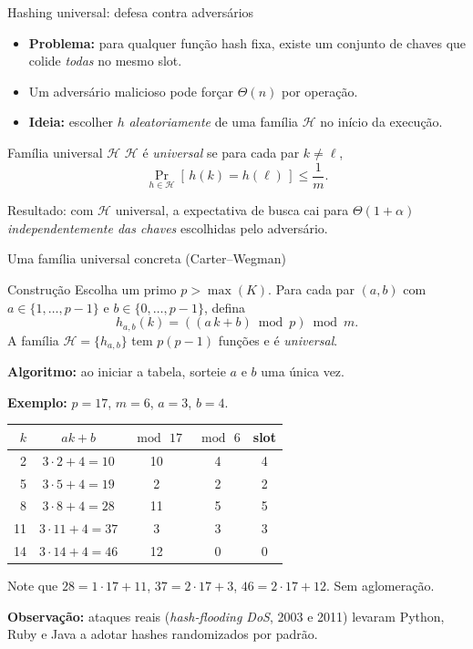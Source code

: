 \documentclass[aspectratio=169]{beamer}
\begin{document}
\begin{frame}{Hashing universal: defesa contra adversários}
\begin{itemize}
\item \textbf{Problema:} para qualquer função hash fixa, existe um conjunto de chaves que colide \emph{todas} no mesmo slot.
\item Um adversário malicioso pode forçar $\Theta(n)$ por operação.
\item \textbf{Ideia:} escolher $h$ \emph{aleatoriamente} de uma família $\mathcal H$ no início da execução.
\end{itemize}
\begin{block}{Família universal $\mathcal H$}
$\mathcal H$ é \emph{universal} se para cada par $k \neq \ell$,
$$\Pr_{h \in \mathcal H}[\,h(k) = h(\ell)\,] \le \frac{1}{m}.$$
\end{block}
Resultado: com $\mathcal H$ universal, a expectativa de busca cai para $\Theta(1 + \alpha)$ \emph{independentemente das chaves} escolhidas pelo adversário.
\end{frame}

\begin{frame}[shrink=5]{Uma família universal concreta (Carter--Wegman)}
\begin{block}{Construção}
Escolha um primo $p > \max(K)$. Para cada par $(a, b)$ com $a \in \{1, \dots, p-1\}$ e $b \in \{0, \dots, p-1\}$, defina
$$h_{a,b}(k) = ((a\,k + b) \bmod p) \bmod m.$$
A família $\mathcal H = \{h_{a,b}\}$ tem $p(p-1)$ funções e é \emph{universal}.
\end{block}
\textbf{Algoritmo:} ao iniciar a tabela, sorteie $a$ e $b$ uma única vez.

\smallskip
\textbf{Exemplo:} $p = 17$, $m = 6$, $a = 3$, $b = 4$.
\centering
\begin{tabular}{rcccc}
\toprule
$k$ & $a k + b$ & $\bmod\, 17$ & $\bmod\, 6$ & slot \\
\midrule
2  & $3\cdot 2 + 4 = 10$  & 10 & 4 & 4 \\
5  & $3\cdot 5 + 4 = 19$  & 2  & 2 & 2 \\
8  & $3\cdot 8 + 4 = 28$  & 11 & 5 & 5 \\
11 & $3\cdot 11 + 4 = 37$ & 3  & 3 & 3 \\
14 & $3\cdot 14 + 4 = 46$ & 12 & 0 & 0 \\
\bottomrule
\end{tabular}

\smallskip
Note que $28 = 1\cdot 17 + 11$, $37 = 2\cdot 17 + 3$, $46 = 2\cdot 17 + 12$. Sem aglomeração.

\smallskip
\textbf{Observação:} ataques reais (\emph{hash-flooding DoS}, 2003 e 2011) levaram Python, Ruby e Java a adotar hashes randomizados por padrão.
\end{frame}
\end{document}
